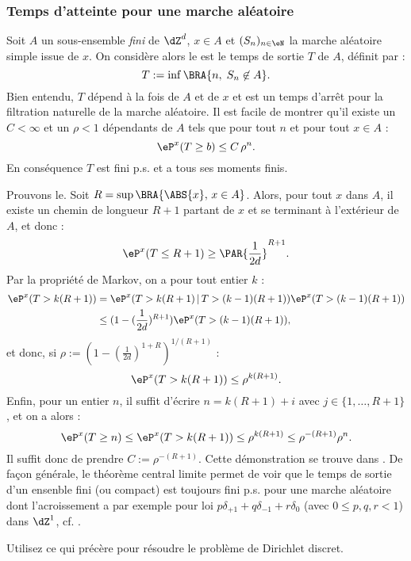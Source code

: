 {{%

%
\subsubsection{Temps d'atteinte pour une marche aléatoire}
%

Soit $A$ un sous-ensemble \emph{fini} de $\dZ^d$, $x\in A$ et
$(S_n)_{n\in\eN}$ la marche aléatoire simple issue de $x$.  On
considère alors le est le temps de sortie $T$ de $A$, définit par :
$$
T:=\inf\BRA{n,\;S_n\not\in A}.
$$
Bien entendu, $T$ dépend à la fois de $A$ et de $x$ et est un temps
d'arrêt pour la filtration naturelle de la marche aléatoire. Il est
facile de montrer qu'il existe un $C<\infty$ et un $\rho<1$ dépendants
de $A$ tels que pour tout $n$ et pour tout $x\in A$ :
$$
\eP^x(T\geq b) \leq C\,\rho^n.
$$
En conséquence $T$ est fini p.s. et a tous ses moments finis.

Prouvons le. Soit $R=\sup\BRA{\ABS{x},\,x\in A}$. Alors, pour tout $x$
dans $A$, il existe un chemin de longueur $R+1$ partant de $x$ et se
terminant à l'extérieur de $A$, et donc :
$$
\eP^x(T \leq R+1) \geq \PAR{\frac{1}{2d}}^{R+1}.
$$
Par la propriété de Markov, on a pour tout entier $k$ :
\begin{align*}
\eP^x(T>k(R+1))
&=\eP^x(T>k(R+1)\,\vert\,T>(k-1)(R+1)) \eP^x(T>(k-1)(R+1)) \\
&\leq (1-(\frac{1}{2d})^{R+1})\eP^x(T>(k-1)(R+1)),
\end{align*}
et donc, si $\rho:=(1-(\frac{1}{2d})^{1+R})^{1/(R+1)}$ :
$$
\eP^x(T>k(R+1)) \leq \rho^{k(R+1)}.
$$
Enfin, pour un entier $n$, il suffit d'écrire $n=k(R+1)+i$ avec
$j\in\{1,\ldots,R+1\}$, et on a alors :
$$
\eP^x(T\geq n) \leq \eP^x(T>k(R+1)) \leq \rho^{k(R+1)} \leq
\rho^{-(R+1)}\rho^n.
$$
Il suffit donc de prendre $C:=\rho^{-(R+1)}$.  Cette démonstration
se trouve dans \cite[Lemme 1.4.4]{lawler}.  De façon générale, le
théorème central limite permet de voir que le temps de sortie d'un
ensenble fini (ou compact) est toujours fini p.s.  pour une marche
aléatoire dont l'acroissement a par exemple pour loi
$p\delta_{+1}+q\delta_{-1}+r\delta_0$ (avec $0\leq p,q,r<1$) dans $\dZ^1$, cf.
\cite[exercice 8.8 page 247]{cottrell-duhamel}.


\begin{exo}
Utilisez ce qui précère pour résoudre le problème de Dirichlet discret.
\end{exo}

}}
